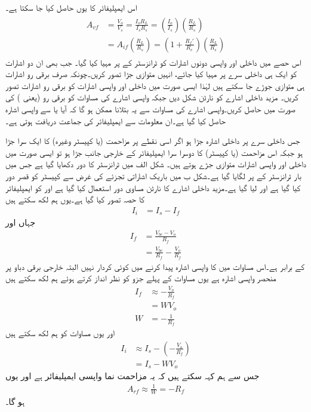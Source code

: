 اس ایمپلیفائر کا  یوں حاصل کیا جا سکتا ہے۔
\begin{gather}
\begin{aligned}
A_{vf}&=\frac{V_o}{V_s}=\frac{I_o R_L}{I_s R_s}=\left (\frac{I_o}{I_s} \right) \left (\frac{R_L}{R_s} \right) \\
&=A_{if} \left(\frac{R_L}{R_s} \right)=\left( 1+\frac{R_f'}{R_e}\right) \left(\frac{R_L}{R_s} \right)
\end{aligned}
\end{gather}
%
اس حصے میں  داخلی اور واپسی دونوں اشارات کو ٹرانزسٹر کے  پر مہیا کیا گیا۔ جب بھی ان  دو اشارات کو ایک ہی داخلی سرے پر مہیا کیا جائے، انہیں متوازی جڑا تصور کریں۔چونکہ صرف برقی رو اشارات ہی متوازی جوڑے جا سکتے ہیں لہٰذا ایسی صورت میں داخلی اور واپسی اشارات کو برقی رو اشارات تصور کریں۔ مزید داخلی اشارے کو نارٹن شکل دیں جبکہ واپسی اشارے کی مساوات کو برقی رو (یعنی ) کی صورت میں حاصل کریں۔واپسی اشارے کی مساوات سے یہ بتلانا ممکن ہو گا کہ آیا  یا  سے واپسی اشارہ حاصل کیا گیا ہے۔ان معلومات سے ایمپلیفائر کی جماعت دریافت ہوتی ہے۔ 

 جس داخلی سرے پر داخلی اشارہ جڑا ہو اگر اسی نقطے پر مزاحمت (یا کپیسٹر وغیرہ) کا ایک سرا جڑا ہو جبکہ اس مزاحمت (یا کپیسٹر) کا دوسرا سرا ایمپلیفائر کے خارجی جانب جڑا ہو تو ایسی صورت میں داخلی اور واپسی اشارات متوازی جڑے ہوتے ہیں۔
شکل  الف میں ٹرانزسٹر کا دور دکھایا گیا ہے جس میں بار  ٹرانزسٹر کے  پر لگایا گیا ہے۔شکل  ب میں باریک اشاراتی تجزئے کی غرض سے کپیسٹر کو قصر دور کیا گیا ہے اور   لیا گیا ہے۔مزید داخلی اشارے کا نارٹن مساوی دور استعمال کیا گیا ہے اور  کو ایمپلیفائر کا حصہ تصور کیا گیا ہے۔یوں ہم لکھ سکتے ہیں
\begin{align} \label{مساوات_واپسی_مزاحمت_نما_واپسی_رو_اشارہ}
I_i&=I_s-I_f
\end{align}
جہاں  اور
\begin{align*}
I_f&=\frac{V_{be}-V_o}{R_f} \\
&=\frac{V_{be}}{R_f}-\frac{V_o}{R_f}
\end{align*}
کے برابر ہے۔اس مساوات میں  کا واپسی اشارہ پیدا کرنے میں کوئی کردار نہیں البتہ  خارجی برقی دباو پر منحصر واپسی اشارہ ہے یوں مساوات کے پہلے جزو کو نظر انداز کرتے ہوئے ہم لکھ سکتے ہیں
\begin{align*}
I_f & \approx -\frac{V_o}{R_f} \\
&=W V_o \\
W&=-\frac{1}{R_f}
\end{align*}
اور یوں مساوات  کو ہم لکھ سکتے ہیں
\begin{align*}
I_i &\approx I_s-\left(-\frac{V_o}{R_f} \right) \\
&=I_s-W V_o
\end{align*}
جس سے ہم کہہ سکتے ہیں کہ یہ مزاحمت نما واپسی ایمپلیفائر ہے اور یوں
\begin{align}
A_{rf} \approx \frac{1}{W}=-R_f
\end{align}
ہو گا۔

